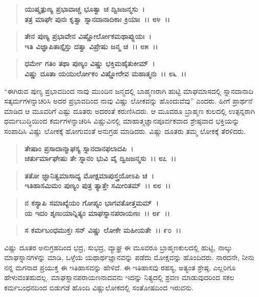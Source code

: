 \begin{verse}
\textbf{ಯುಷ್ಮತ್ಪುಣ್ಯ ಪ್ರಭಾವಾಚ್ಚ ಭೂತ್ವಾ ಚ ದ್ವಿಜಜನ್ಮಸು~।}\\\textbf{ತತ್ರ ಮಾಘೇ ಪುನಃ ಕೃತ್ವಾ ಸ್ನಾನದಾನಾದಿಕಾಃ ಕ್ರಿಯಾಃ~।। ೮೪~।।} 
\end{verse}

\begin{verse}
\textbf{ತೇನ ಪುಣ್ಯ ಪ್ರಭಾವೇನ ವಿಷ್ಣೋರ್ಲೋಕಮಥಾಪ್ನುಯಃ~।}\\\textbf{ಇತಿ ವಿಜ್ಞಾಪಿತಾಸ್ತೈಸ್ತು ದತ್ವಾ ವಿಪ್ರೇಷು ಜನ್ಮ ಚ~।। ೮೫~।। }
\end{verse}

\begin{verse}
\textbf{ಧರ್ಮೇ ಗತಿಂ ತಥಾ ಪುಣ್ಯಂ ವಿಷ್ಣು ಭಕ್ತಿಮಹೈತುಕೀಮ್~।}\\\textbf{ವಿಷ್ಣು ದೂತಾ ಯಯುರ್ಲೋಕಂ ವಿಷ್ಣೋರೇವ ಮಹಾತ್ಮನಃ~।। ೮೬~।।}
\end{verse}

“ಈಗಿರುವ ಪುಣ್ಯ ಪ್ರಭಾವದಿಂದ ನಾವು ಮುಂದಿನ ಜನ್ಮದಲ್ಲಿ ಬಾಹ್ಮಣರಾಗಿ ಹುಟ್ಟಿ ಮಾಘಮಾಸದಲ್ಲಿ ಸ್ನಾನದಾನಾದಿ ಸತ್ಕರ್ಮಗಳನ್ನಾಚರಿಸಿ ಅದರ ಪ್ರಭಾವದಿಂದ ನಾವು ವಿಷ್ಣು ಲೋಕವನ್ನು ಹೊಂದುವೆವು” ಎಂದರು. ಹೀಗೆ ಪ್ರಾರ್ಥನೆ ಮಾಡಿದ ಆ ಮೂವರಿಗೆ ಎಷ್ಟು ದೂತರು ಅದರಂತೆ ಕರುಣಿಸಿದರು. ಆ ಮೂವರೂ ಬ್ರಾಹ್ಮಣ ಕುಲದಲ್ಲಿ ಉತ್ಪನ್ನರಾಗಿ ಧರ್ಮಬುದ್ಧಿಯಿಂದ ಕರ್ಮಗಳನ್ನಾಚರಿಸಿ ವಿಷ್ಣುವಿನಲ್ಲಿ ಮಾಹಾತ್ಮಜ್ಞಾನಪೂರ್ವಕವಾದ ಶ್ರೇಷ್ಠವಾದ ಭಕ್ತಿಯನ್ನು ಸಂಪಾದಿಸಿ ವಿಷ್ಣು ಲೋಕಕ್ಕೆ ಹೋಗುವಂತೆ ಅನುಗ್ರಹ ಮಾಡಿದರು. ವಿಷ್ಣು ದೂತರು ತಮ್ಮ ಲೋಕಕ್ಕೆ ತೆರಳಿದರು.

\begin{verse}
\textbf{ತೇಷಾಂ ಪ್ರಸಾದಾನ್ಮಾಘಸ್ಯ ಸ್ನಾನದಾನಫಲಾದಪಿ~।}\\\textbf{ಚರ್ತುರ್ಮಾಘೇಷು ತೇ ಸ್ನಾನಂ ಭುವಿ ವೈ ದ್ವಿಜಜನ್ಮಸು~।। ೮೭~।। }
\end{verse}

\begin{verse}
\textbf{ತತೋ ಜ್ಞಾನಿತ್ವಮಾಸಾದ್ಯ ಮೋಕ್ಷಮಾಪುಸ್ತ್ರಯೋಽಪಿ ಚ~।}\\\textbf{ಇತಿಹಾಸಮಿಮಂ ಪುಣ್ಯಂ ಪುತ್ರ ತ್ಯಾತ್ತೇ ಸಮೀರಿತಮ್~।। ೮೮~।। }
\end{verse}

\begin{verse}
\textbf{ನ ಕಸ್ಯಾಪಿ ಸಮಾಖ್ಯೆಯಂ ಗೋಪ್ಯಂ ಭಾಗವತೋತ್ತಮಮ್~।}\\\textbf{ಯ ಇದಂ ಶೃಣುಯಾನ್ನಿತ್ಯಂ ಮಾಘಸ್ನಾನಪರಾಯಣಃ~।। ೮೯~।। }
\end{verse}

\begin{verse}
\textbf{ಸ ಕರ್ಮಬಂಧಮುಕ್ತಃ ಸನ್ ವಿಷ್ಣು ಲೋಕೇ ಮಹೀಯತೇ~।। ೯೦~।।}
\end{verse}

ವಿಷ್ಣು ದೂತರ ಅನುಗ್ರಹದಿಂದ ಭದ್ರ, ಸುಭದ್ರ, ವ್ಯಾಘ್ರ ಈ ಮೂವರೂ ಬ್ರಾಹ್ಮಣಕುಲದಲ್ಲಿ ಹುಟ್ಟಿ, ನಾಲ್ಕು ಮಾಘಸ್ನಾನಗಳನ್ನು ಮಾಡಿ, ಒಳ್ಳೆಯ ಯಥಾರ್ಥಜ್ಞಾನವನ್ನು ಪಡೆದು ಮೋಕ್ಷವನ್ನು ಹೊಂದಿದರು. ನಾರದನೇ, ನೀನು ನನ್ನ ಮಗನಾದ ಪ್ರಯುಕ್ತ ಈ ಇತಿಹಾಸವನ್ನು ಹೇಳಿದೆ. ಈ ಇತಿಹಾಸವು ರಹಸ್ಯ, ಅತ್ಯಂತ ಶ್ರೇಷ್ಠ, ಎಲ್ಲರಿಗೂ ಹೇಳುವಂತಹುದಲ್ಲ. ಮಾಘಸ್ನಾನಪರಾಯಣನಾದವನು ಇದನ್ನು ನಿತ್ಯದಲ್ಲಿ ಶ್ರವಣ ಮಾಡುವುದರಿಂದ ಸಕಲ ಕರ್ಮಬಂಧನದಿಂದ ಬಿಡುಗಡೆ ಹೊಂದಿ ವಿಷ್ಣುಲೋಕದಲ್ಲಿ ಸಂತೋಷದಿಂದ ಇರುವನು.

